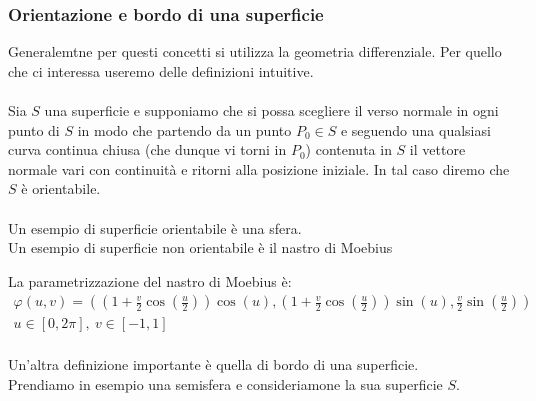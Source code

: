 \documentclass[a4paper, oneside]{article}
\begin{document}
\subsubsection{Orientazione e bordo di una superficie}
Generalemtne per questi concetti si utilizza la geometria differenziale. Per quello che ci interessa useremo delle definizioni intuitive.\\
\hfill\\
Sia  $S$ una superficie e supponiamo che si possa 
scegliere il verso normale in ogni punto di $S$ in modo 
che partendo da un punto $P_0 \in S$ e seguendo una qualsiasi 
curva continua chiusa (che dunque vi torni in $P_0$) 
contenuta in $S$ il vettore normale vari con continuità e ritorni alla posizione iniziale. 
In tal caso diremo che $S$ è orientabile.\\
\hfill\\
Un esempio di superficie orientabile è una sfera.\\
Un esempio di superficie non orientabile è il nastro di Moebius
\begin{center}
\end{center}
La parametrizzazione del nastro di Moebius è:
\begin{gather*}
  \varphi(u,v) = \left( \left(1 + \frac{v}{2} \cos\left(\frac{u}{2}\right)\right) \cos(u), \left(1 + \frac{v}{2} \cos\left(\frac{u}{2}\right)\right) \sin(u), \frac{v}{2} \sin\left(\frac{u}{2}\right) \right)\\
  u \in [0, 2\pi], \ v \in [-1, 1]
\end{gather*}
\hfill\\
Un'altra definizione importante è quella di bordo di una superficie.\\
Prendiamo in esempio una semisfera e consideriamone la sua superficie $S$.\\
\end{document}
